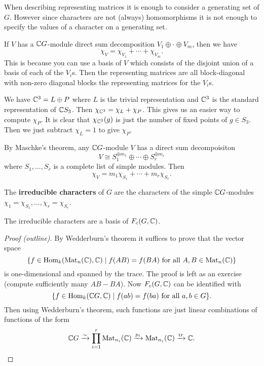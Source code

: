 \begin{rmk}
	When describing representing matrices it is enough to consider a generating set of $G$.
	However since characters are not (always) homomorphisms it is not enough to specify the values of a character on a generating set.
\end{rmk}

\begin{rmk}
	If $V$ has a $\mathbb{C} G$-module direct sum decomposition $V_1 \oplus \cdot \oplus V_m$, then we have
	\[\chi_V = \chi_{V_1}+\cdots+\chi_{V_m}.\]
	This is because you can use a basis of $V$ which consists of the disjoint union of a basis of each of the $V_i$s.
	Then the representing matrices are all block-diagonal with non-zero diagonal blocks the representing matrices for the $V_i$s.
\end{rmk}

\begin{exam}
	We have $\mathbb{C}^3 = L \oplus P$ where $L$ is the trivial representation and $\mathbb{C}^3$ is the standard representation of $\mathbb{C} S_3$.
	Then $\chi_{\mathbb{C}^3} = \chi_L+\chi_P$.
	This gives us an easier way to compute $\chi_P$.
	It is clear that $\chi_{\mathbb{C}^3}(g)$ is just the number of fixed points of $g \in S_3$.
	Then we just subtract $\chi_L=1$ to give $\chi_P$.
\end{exam}

\begin{rmk}
	By Maschke's theorem, any $\mathbb{C} G$-module $V$ has a direct sum decompoisiton
	\[V \cong S_1^{\oplus m_1} \oplus \cdots \oplus S_r^{\oplus m_r}\]
	where $S_1,\ldots,S_r$ is a complete list of simple modules.
	Then
	\[\chi_V = m_1\chi_{S_1} + \cdots + m_r\chi_{S_r}.\]
\end{rmk}

\begin{defn}
	The \textbf{irreducible characters} of $G$ are the characters of the simple $\mathbb{C} G$-modules $\chi_1 = \chi_{S_1}, \ldots, \chi_r = \chi_{S_r}$.
\end{defn}

\begin{thm}
	The irreducible characters are a basis of $F_c(G,\mathbb{C})$.
\end{thm}

\begin{proof}[Proof (outline)]
	By Wedderburn's theorem it suffices to prove that the vector space
	\[\{f \in \operatorname{Hom}_k(\operatorname{Mat}_n(\mathbb{C}),\mathbb{C}) \mid f(AB)=f(BA) \text{ for all } A,B \in \operatorname{Mat}_n(\mathbb{C})\}\]
	is one-dimensional and spanned by the trace.
	The proof is left as an exercise (compute sufficiently many $AB-BA$).
	Now $F_c(G,\mathbb{C})$ can be identified with
	\[\{f \in \operatorname{Hom}_k(\mathbb{C} G,\mathbb{C}) \mid f(ab)=f(ba) \text{ for all } a,b \in G\}.\]
	Then using Wedderburn's theorem, such functions are just linear combinations of functions of the form
	\[\mathbb{C} G \xrightarrow{\sim} \prod_{i=1}^r \operatorname{Mat}_{n_i}(\mathbb{C}) \xrightarrow{p_i} \operatorname{Mat}_{n_i}(\mathbb{C}) \xrightarrow{\operatorname{tr}} \mathbb{C}. \qedhere\]
\end{proof}

